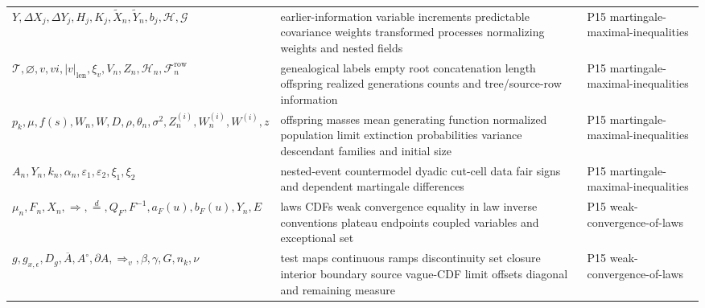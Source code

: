 \begin{longtable}{@{}p{}p{}p{}@{}}
\(Y,\allowbreak \Delta X_j,\allowbreak \Delta Y_j,\allowbreak H_j,\allowbreak K_j,\allowbreak \widetilde X_n,\allowbreak \widetilde Y_n,\allowbreak b_j,\allowbreak \mathcal H,\allowbreak \mathcal G\) & earlier-information variable increments predictable covariance weights transformed processes normalizing weights and nested fields & P15 martingale-\allowbreak{}maximal-\allowbreak{}inequalities \\
\(\mathcal T,\allowbreak \varnothing,\allowbreak v,\allowbreak vi,\allowbreak |v|_{\mathrm{len}},\allowbreak \xi_v,\allowbreak V_n,\allowbreak Z_n,\allowbreak \mathcal H_n,\allowbreak \mathcal F_n^{\mathrm{row}}\) & genealogical labels empty root concatenation length offspring realized generations counts and tree/source-row information & P15 martingale-\allowbreak{}maximal-\allowbreak{}inequalities \\
\(p_k,\allowbreak \mu,\allowbreak f(s),\allowbreak W_n,\allowbreak W,\allowbreak D,\allowbreak \rho,\allowbreak \theta_n,\allowbreak \sigma^2,\allowbreak Z_n^{(i)},\allowbreak W_n^{(i)},\allowbreak W^{(i)},\allowbreak z\) & offspring masses mean generating function normalized population limit extinction probabilities variance descendant families and initial size & P15 martingale-\allowbreak{}maximal-\allowbreak{}inequalities \\
\(A_n,\allowbreak Y_n,\allowbreak k_n,\allowbreak \alpha_n,\allowbreak \varepsilon_1,\allowbreak \varepsilon_2,\allowbreak \xi_1,\allowbreak \xi_2\) & nested-event countermodel dyadic cut-cell data fair signs and dependent martingale differences & P15 martingale-\allowbreak{}maximal-\allowbreak{}inequalities \\
\(\mu_n,\allowbreak F_n,\allowbreak X_n,\allowbreak \Rightarrow,\allowbreak \stackrel{d}{=},\allowbreak Q_F,\allowbreak F^{-1},\allowbreak a_F(u),\allowbreak b_F(u),\allowbreak Y_n,\allowbreak E\) & laws CDFs weak convergence equality in law inverse conventions plateau endpoints coupled variables and exceptional set & P15 weak-\allowbreak{}convergence-\allowbreak{}of-\allowbreak{}laws \\
\(g,\allowbreak g_{x,\epsilon},\allowbreak D_g,\allowbreak \overline A,\allowbreak A^\circ,\allowbreak \partial A,\allowbreak \Rightarrow_v,\allowbreak \beta,\allowbreak \gamma,\allowbreak G,\allowbreak n_k,\allowbreak \nu\) & test maps continuous ramps discontinuity set closure interior boundary source vague-CDF limit offsets diagonal and remaining measure & P15 weak-\allowbreak{}convergence-\allowbreak{}of-\allowbreak{}laws \\

\end{longtable}
